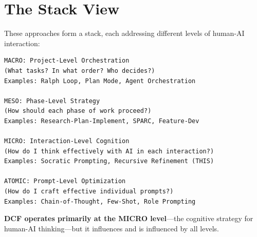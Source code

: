 \chapter{The Stack View}

These approaches form a stack, each addressing different levels of human-AI interaction:

\begin{lstlisting}
MACRO: Project-Level Orchestration
(What tasks? In what order? Who decides?)
Examples: Ralph Loop, Plan Mode, Agent Orchestration

MESO: Phase-Level Strategy
(How should each phase of work proceed?)
Examples: Research-Plan-Implement, SPARC, Feature-Dev

MICRO: Interaction-Level Cognition
(How do I think effectively with AI in each interaction?)
Examples: Socratic Prompting, Recursive Refinement (THIS)

ATOMIC: Prompt-Level Optimization
(How do I craft effective individual prompts?)
Examples: Chain-of-Thought, Few-Shot, Role Prompting
\end{lstlisting}

\textbf{DCF operates primarily at the MICRO level}---the cognitive strategy for human-AI thinking---but it influences and is influenced by all levels.

